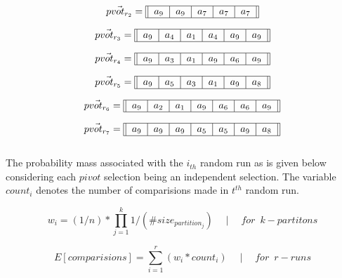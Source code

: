 \documentclass[usenames,dvipsnames,acmsmall]{acmart}
\begin{document}
\begin{equation}
	\vec{pvot_{r_{2}}} = \begin{tabular}{||c|c|c|c|c||}
		\hline
		$a_9$ & $a_9$ & $a_7$ & $a_7$ & $a_7$ \\
		\hline
	\end{tabular}
\end{equation} 

\begin{equation}
	\vec{pvot_{r_{3}}} = \begin{tabular}{||c|c|c|c|c|c||}
		\hline
		$a_9$ & $a_4$ & $a_1$ & $a_4$ & $a_9$ & $a_9$ \\
		\hline
	\end{tabular}
\end{equation} 

\begin{equation}
	\vec{pvot_{r_{4}}} = \begin{tabular}{||c|c|c|c|c|c||}
		\hline
		$a_9$ & $a_3$ & $a_1$ & $a_9$ & $a_6$ & $a_9$ \\
		\hline
	\end{tabular}
\end{equation} 

\begin{equation}
	\vec{pvot_{r_{5}}} = \begin{tabular}{||c|c|c|c|c|c||}
		\hline
		$a_9$ & $a_5$ & $a_3$ & $a_1$ & $a_9$ & $a_8$ \\
		\hline
	\end{tabular}
\end{equation}  

\begin{equation}
	\vec{pvot_{r_{6}}} = \begin{tabular}{||c|c|c|c|c|c|c||}
		\hline
		$a_9$ & $a_2$ & $a_1$ & $a_9$ & $a_6$ & $a_6$ & $a_9$ \\
		\hline
	\end{tabular}
\end{equation} 

\begin{equation}
	\vec{pvot_{r_{7}}} = \begin{tabular}{||c|c|c|c|c|c|c||}
		\hline
		$a_9$ & $a_9$ & $a_9$ & $a_5$ & $a_5$ & $a_9$ & $a_8$ \\
		\hline
	\end{tabular}
\end{equation} \\

The probability mass associated with the $i_{th}$ random run as is given below considering each $pivot$ selection being an independent selection. The variable $count_i$ denotes the number of comparisions made in $t^{th}$ random run.

\begin{equation}
	w_i = (1 / n) * \prod_{j=1}^{k} 1 / (\#size_{partition_{j}}) \quad \mid \quad for \enspace k-partitons
\end{equation}

\begin{equation}
	E[comparisions] = \sum_{i=1}^{r} (w_i * count_i) \quad \mid \quad for \enspace r-runs
\end{equation}
\end{document}
